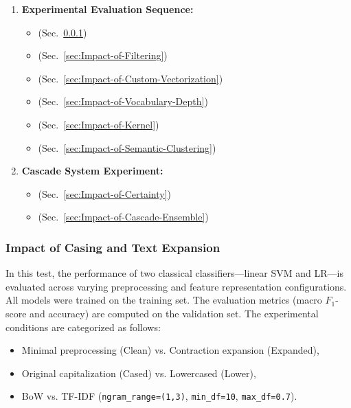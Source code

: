 \documentclass[a4paper,fleqn]{cas-dc}
\newcommand{\logreg}{LR}
\newcommand{\code}[1]{\texttt{#1}}
\begin{document}
\begin{enumerate}
	\item \textbf{Experimental Evaluation Sequence:}
	\begin{itemize}
		\item {} (Sec.~\ref{sec:Impact-of-Casing-and-Text-Expansion})
		\item {} (Sec.~\ref{sec:Impact-of-Filtering})
		\item {} (Sec.~\ref{sec:Impact-of-Custom-Vectorization})
		\item {} (Sec.~\ref{sec:Impact-of-Vocabulary-Depth})
		\item {} (Sec.~\ref{sec:Impact-of-Kernel})
		\item {} (Sec.~\ref{sec:Impact-of-Semantic-Clustering})
	\end{itemize}
	
	\item \textbf{Cascade System Experiment:}
	\begin{itemize}
		\item {} (Sec.~\ref{sec:Impact-of-Certainty})
		\item {} (Sec.~\ref{sec:Impact-of-Cascade-Ensemble})
	\end{itemize}
\end{enumerate}


\subsubsection{Impact of Casing and Text Expansion}
\label{sec:Impact-of-Casing-and-Text-Expansion}

In this test, the performance of two classical classifiers---linear SVM and \logreg{}---is evaluated across varying preprocessing and feature representation configurations. All models were trained on the training set. The evaluation metrics (macro $F_1$-score and accuracy) are computed on the validation set. The experimental conditions are categorized as follows:
\begin{itemize}
	\item Minimal preprocessing (Clean) vs. Contraction expansion (Expanded),
	\item Original capitalization (Cased) vs. Lowercased (Lower),
	\item BoW vs. TF-IDF (\code{ngram\_range=(1,3)}, \code{min\_df=10}, \code{max\_df=0.7}).
\end{itemize}
\end{document}
